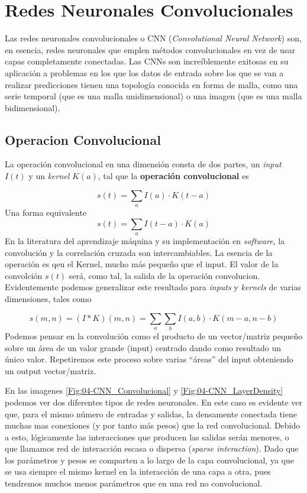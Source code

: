 \chapter{Redes Neuronales Convolucionales}

Las redes neuronales convolucionales o CNN (\textit{Convolutional Neural Network}) son, en esencia, redes neuronales que emplen métodos convolucionales en vez de usar capas completamente conectadas. Las CNNs son increíblemente exitosas en su aplicación a problemas en los que los datos de entrada sobre los que se van a realizar predicciones tienen una topología conocida en forma de malla, como una serie temporal (que es una malla unidimensional) o una imagen (que es una malla bidimensional).

\section{Operacion Convolucional}

La operación convolucional en una dimensión consta de dos partes, un \textit{input} $I(t)$ y un \textit{kernel} $K(a)$, tal que la \textbf{operación convolucional} es 

\begin{equation}
    s(t) = \sum_a I(a) \cdot K(t-a)
\end{equation}
Una forma equivalente 
\begin{equation}
    s(t) = \sum_a I(t-a) \cdot K(a)
\end{equation}
En la literatura del aprendizaje máquina y su implementación en \textit{software}, la convolución y la correlación cruzada son intercambiables. La esencia de la operación es qeu el Kernel, mucho más pequeño que el input. El valor de la convolción $s(t)$ será, como tal, la salida de la operación convolucion. Evidentemente podemos generalizar este resultado para \textit{inputs} y \textit{kernels} de varias dimensiones, tales como

\begin{equation}
    s(m,n) = (I * K) (m,n) = \sum_{a} \sum_{b} I(a,b) \cdot K(m-a,n-b)
\end{equation}
Podemos pensar en la convolución como el producto de un vector/matriz pequeño sobre un área de un valor grande (input) centrado dando como resultado un único valor. Repetiremos este proceso sobre varias ``áreas'' del input obteniendo un output vector/matriz. 

En las imagenes \cref{Fig:04-CNN_Convolucional} y \cref{Fig:04-CNN_LayerDensity} podemos ver dos diferentes tipos de redes neuronales. En este caso es evidente ver que, para el mismo número de entradas y salidas, la densamente conectada tiene muchas mas conexiones (y por tanto más pesos) que la red convolucional. Debido a esto, lógicamente las interacciones que producen las salidas serán menores, o que llamamos red de interacción escasa o dispersa (\textit{sparse interaction}). Dado que los parámetros y pesos se comparten a lo largo de la capa convolucional, ya que se usa siempre el mismo kernel en la interacción de una capa a otra, pues tendremos muchos menos parámetros que en una red no convolucional. 

